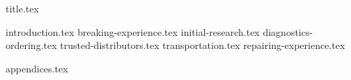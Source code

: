 \documentclass[final]{scrreprt} %
\begin{document}

{title.tex}
\newpage
\tableofcontents

\newpage
{}
{introduction.tex}
{breaking-experience.tex}
{initial-research.tex}
{diagnostics-ordering.tex}
{trusted-distributors.tex}
{transportation.tex}
{repairing-experience.tex}

\printbibliography
{appendices.tex}
\end{document}
